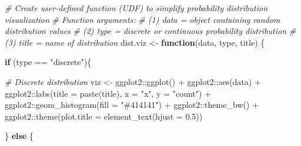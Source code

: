 \documentclass[
]{book}
\newenvironment{Shaded}{\begin{snugshade}}{\end{snugshade}}
\newcommand{\AttributeTok}[1]{\textcolor[rgb]{0.77,0.63,0.00}{#1}}
\newcommand{\CommentTok}[1]{\textcolor[rgb]{0.56,0.35,0.01}{\textit{#1}}}
\newcommand{\ControlFlowTok}[1]{\textcolor[rgb]{0.13,0.29,0.53}{\textbf{#1}}}
\newcommand{\FloatTok}[1]{\textcolor[rgb]{0.00,0.00,0.81}{#1}}
\newcommand{\FunctionTok}[1]{\textcolor[rgb]{0.00,0.00,0.00}{#1}}
\newcommand{\NormalTok}[1]{#1}
\newcommand{\OtherTok}[1]{\textcolor[rgb]{0.56,0.35,0.01}{#1}}
\newcommand{\SpecialCharTok}[1]{\textcolor[rgb]{0.00,0.00,0.00}{#1}}
\newcommand{\StringTok}[1]{\textcolor[rgb]{0.31,0.60,0.02}{#1}}
\begin{document}
\begin{Shaded}
\begin{Highlighting}[]
\CommentTok{\# Create user{-}defined function (UDF) to simplify probability distribution visualization}
\CommentTok{\# Function arguments:}
\CommentTok{\#   (1) data = object containing random distribution values }
\CommentTok{\#   (2) type = \textquotesingle{}discrete\textquotesingle{} or \textquotesingle{}continuous\textquotesingle{} probability distribution}
\CommentTok{\#   (3) title = name of distribution}
\NormalTok{dist.viz }\OtherTok{\textless{}{-}} \ControlFlowTok{function}\NormalTok{(data, type, title) \{}
  
  \ControlFlowTok{if}\NormalTok{ (type }\SpecialCharTok{==} \StringTok{"discrete"}\NormalTok{)\{}
    
    \CommentTok{\# Discrete distribution}
\NormalTok{    viz }\OtherTok{\textless{}{-}}\NormalTok{ ggplot2}\SpecialCharTok{::}\FunctionTok{ggplot}\NormalTok{() }\SpecialCharTok{+} 
\NormalTok{           ggplot2}\SpecialCharTok{::}\FunctionTok{aes}\NormalTok{(data) }\SpecialCharTok{+} 
\NormalTok{           ggplot2}\SpecialCharTok{::}\FunctionTok{labs}\NormalTok{(}\AttributeTok{title =} \FunctionTok{paste}\NormalTok{(title), }\AttributeTok{x =} \StringTok{"x"}\NormalTok{, }\AttributeTok{y =} \StringTok{"count"}\NormalTok{) }\SpecialCharTok{+} 
\NormalTok{           ggplot2}\SpecialCharTok{::}\FunctionTok{geom\_histogram}\NormalTok{(}\AttributeTok{fill =} \StringTok{"\#414141"}\NormalTok{) }\SpecialCharTok{+}
\NormalTok{           ggplot2}\SpecialCharTok{::}\FunctionTok{theme\_bw}\NormalTok{() }\SpecialCharTok{+}
\NormalTok{           ggplot2}\SpecialCharTok{::}\FunctionTok{theme}\NormalTok{(}\AttributeTok{plot.title =} \FunctionTok{element\_text}\NormalTok{(}\AttributeTok{hjust =} \FloatTok{0.5}\NormalTok{))}
    
\NormalTok{  \} }\ControlFlowTok{else}\NormalTok{ \{}
    

\end{Highlighting}
\end{Shaded}
\end{document}
